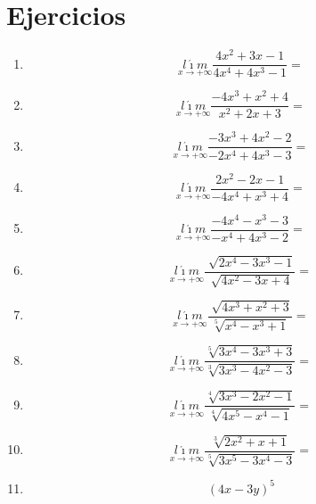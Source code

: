 \documentclass[oneside,spanish,letter]{article}
\begin{document}
\section{Ejercicios}
\begin{enumerate}
 \item $$\underset{x\rightarrow +\infty}{l\acute{\imath}m} \frac{4x^2+3x-1}{4x^4+4x^3-1}=$$
 \item $$\underset{x\rightarrow +\infty}{l\acute{\imath}m} \frac{-4x^3+x^2+4}{x^2+2x+3}=$$
 \item $$\underset{x\rightarrow +\infty}{l\acute{\imath}m} \frac{-3x^3+4x^2-2}{-2x^4+4x^3-3}=$$
 \item $$\underset{x\rightarrow +\infty}{l\acute{\imath}m} \frac{2x^2-2x-1}{-4x^4+x^3+4}=$$
 \item $$\underset{x\rightarrow +\infty}{l\acute{\imath}m} \frac{-4x^4-x^3-3}{-x^4+4x^3-2}=$$
 \item $$\underset{x\rightarrow +\infty}{l\acute{\imath}m} \frac{\sqrt[]{2x^4-3x^3-1}}{\sqrt[]{4x^2-3x+4}}=$$
 \item $$\underset{x\rightarrow +\infty}{l\acute{\imath}m} \frac{\sqrt[]{4x^3+x^2+3}}{\sqrt[5]{x^4-x^3+1}}=$$
 \item $$\underset{x\rightarrow +\infty}{l\acute{\imath}m} \frac{\sqrt[5]{3x^4-3x^3+3}}{\sqrt[3]{3x^3-4x^2-3}}=$$
 \item $$\underset{x\rightarrow +\infty}{l\acute{\imath}m} \frac{\sqrt[4]{3x^3-2x^2-1}}{\sqrt[4]{4x^5-x^4-1}}=$$
 \item $$\underset{x\rightarrow +\infty}{l\acute{\imath}m} \frac{\sqrt[3]{2x^2+x+1}}{\sqrt[5]{3x^5-3x^4-3}}=$$
\item $$(4x-3y)^5$$
 \end{enumerate}
  \newpage
\end{document}
